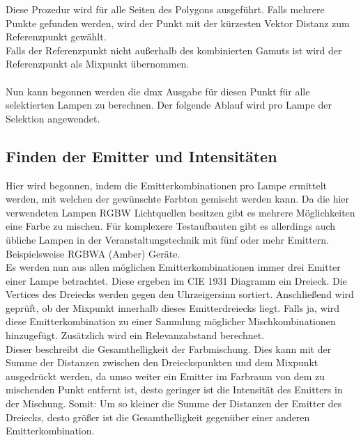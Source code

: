 \documentclass[11pt]{scrartcl}
\begin{document}
Diese Prozedur wird für alle Seiten des Polygons ausgeführt. Falls mehrere Punkte gefunden werden, wird der Punkt mit der kürzesten Vektor Distanz zum
Referenzpunkt gewählt.\\
Falls der Referenzpunkt nicht außerhalb des kombinierten Gamuts ist wird der Referenzpunkt als Mixpunkt übernommen.\\
\\
Nun kann begonnen werden die \ac{dmx} Ausgabe für diesen Punkt für alle selektierten Lampen zu berechnen. Der folgende Ablauf wird pro Lampe der Selektion
angewendet.
\subsection{Finden der Emitter und Intensitäten}
Hier wird begonnen, indem die Emitterkombinationen pro Lampe ermittelt werden, mit welchen der gewünschte Farbton gemischt werden kann. Da die hier
verwendeten Lampen RGBW Lichtquellen besitzen gibt es mehrere Möglichkeiten eine Farbe zu mischen. Für komplexere Testaufbauten gibt es allerdings auch
übliche Lampen in der Veranstaltungstechnik mit fünf oder mehr Emittern. Beispielsweise RGBWA (Amber) Geräte.\\
Es werden nun aus allen möglichen Emitterkombinationen immer drei Emitter einer Lampe betrachtet. Diese ergeben im CIE 1931 Diagramm ein Dreieck. Die
Vertices des Dreiecks werden gegen den Uhrzeigersinn sortiert. Anschließend wird geprüft, ob der Mixpunkt innerhalb dieses Emitterdreiecks liegt.
Falls ja, wird diese Emitterkombination zu einer Sammlung möglicher Mischkombinationen hinzugefügt. Zusätzlich wird ein Relevanzabstand berechnet.\\
Dieser beschreibt die Gesamthelligkeit der Farbmischung. Dies kann mit der Summe der Distanzen zwischen den Dreieckspunkten und dem Mixpunkt ausgedrückt
werden, da umso weiter ein Emitter im Farbraum von dem zu mischenden Punkt entfernt ist, desto geringer ist die Intensität des Emitters in der Mischung.
Somit: Um so kleiner die Summe der Distanzen der Emitter des Dreiecks, desto größer ist die Gesamthelligkeit gegenüber einer anderen Emitterkombination.
\end{document}
